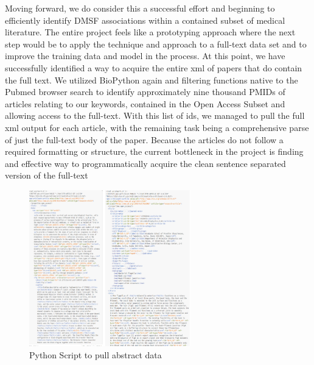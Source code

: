 \documentclass{article} %
\begin{document}
	Moving forward, we do consider this a successful effort and beginning to efficiently identify DMSF associations within a contained subset of medical literature. The entire project feels like a prototyping approach where the next step would be to apply the technique and approach to a full-text data set and to improve the training data and model in the process. At this point, we have successfully identified a way to acquire the entire xml of papers that do contain the full text. We utilized BioPython again and filtering functions native to the Pubmed browser search to identify approximately nine thousand PMIDs of articles relating to our keywords, contained in the Open Access Subset and allowing access to the full-text. With this list of ids, we managed to pull the full xml output for each article, with the remaining task being a comprehensive parse of just the full-text body of the paper. Because the articles do not follow a required formatting or structure, the current bottleneck in the project is finding and effective way to programmatically acquire the clean sentence separated version of the full-text
   
\begin{figure}[h!]
\centering
\includegraphics[width=70mm]{Screenshot_118.png}
\caption{Python Script to pull abstract data}
\end{figure}
\end{document}
